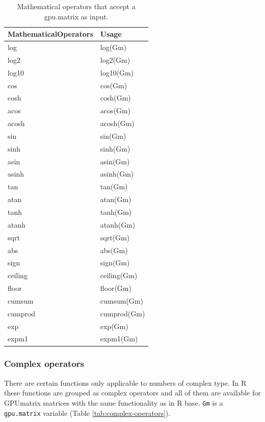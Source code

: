 \begin{table}

\caption{\label{tab:math-operators}Mathematical operators that accept a gpu.matrix as input.}
\centering
\begin{tabular}[t]{l|l}
\hline
MathematicalOperators & Usage\\
\hline
log & log(Gm)\\
\hline
log2 & log2(Gm)\\
\hline
log10 & log10(Gm)\\
\hline
cos & cos(Gm)\\
\hline
cosh & cosh(Gm)\\
\hline
acos & acos(Gm)\\
\hline
acosh & acosh(Gm)\\
\hline
sin & sin(Gm)\\
\hline
sinh & sinh(Gm)\\
\hline
asin & asin(Gm)\\
\hline
asinh & asinh(Gm)\\
\hline
tan & tan(Gm)\\
\hline
atan & atan(Gm)\\
\hline
tanh & tanh(Gm)\\
\hline
atanh & atanh(Gm)\\
\hline
sqrt & sqrt(Gm)\\
\hline
abs & abs(Gm)\\
\hline
sign & sign(Gm)\\
\hline
ceiling & ceiling(Gm)\\
\hline
floor & floor(Gm)\\
\hline
cumsum & cumsum(Gm)\\
\hline
cumprod & cumprod(Gm)\\
\hline
exp & exp(Gm)\\
\hline
expm1 & expm1(Gm)\\
\hline
\end{tabular}
\end{table}

\hypertarget{complex-operators}{%
\subsubsection{Complex operators}\label{complex-operators}}

There are certain functions only applicable to numbers of complex type. In R these functions are grouped as complex operators and all of them are available for GPUmatrix matrices with the same functionality as in R base. \texttt{Gm} is a \texttt{gpu.matrix} variable (Table \ref{tab:complex-operators}).

